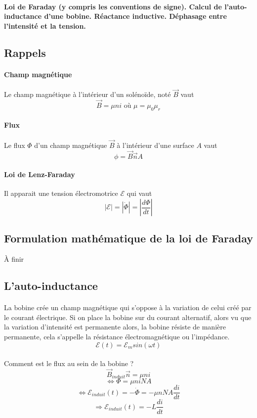 \documentclass[a4paper]{article}
\begin{document}
\paragraph{}\textbf{Loi de Faraday (y compris les conventions de signe). Calcul de l'auto-inductance d'une bobine. Réactance inductive. Déphasage entre l'intensité et la tension.}
\subsection{Rappels}
\paragraph{Champ magnétique}Le champ magnétique à l'intérieur d'un solénoïde, noté $\vec{B}$ vaut
\[\vec{B}=\mu n i\text{ où } \mu=\mu_0\mu_r\]
\paragraph{Flux}Le flux $\Phi$ d'un champ magnétique $\vec{B}$ à l'intérieur d'une surface $A$ vaut
\[\phi=\vec{B}\vec{n}A\]
\paragraph{Loi de Lenz-Faraday}Il apparait une tension électromotrice $\mathscr{E}$ qui vaut
\[\left|\mathscr{E}\right|=\left|\dot{\Phi}\right|=\left|\frac{d\Phi}{dt}\right|\]
\subsection{Formulation mathématique de la loi de Faraday}
\begin{center}\Huge{À finir}\end{center}
\subsection{L'auto-inductance}
\paragraph{}La bobine crée un champ magnétique qui s'oppose à la variation de celui créé par le courant électrique. Si on place la bobine sur du courant alternatif, alors vu que la variation d'intensité est permanente alors, la bobine résiste de manière permanente, cela s'appelle la résistance électromagnétique ou l'impédance.
\[\mathscr{E}(t)=\mathscr{E}_msin(\omega t)\]
\paragraph{}Comment est le flux au sein de la bobine ?
\[\vec{B}_{induit}\vec{n}=\mu n i\]
\[\Leftrightarrow \Phi=\mu niNA\]
\[\Leftrightarrow \mathscr{E}_{induit}(t)=-\dot{\Phi}=-\mu nNA\frac{di}{dt}\]
\[\Rightarrow \mathscr{E}_{induit}(t)=-L\frac{di}{dt}\]
\end{document}
